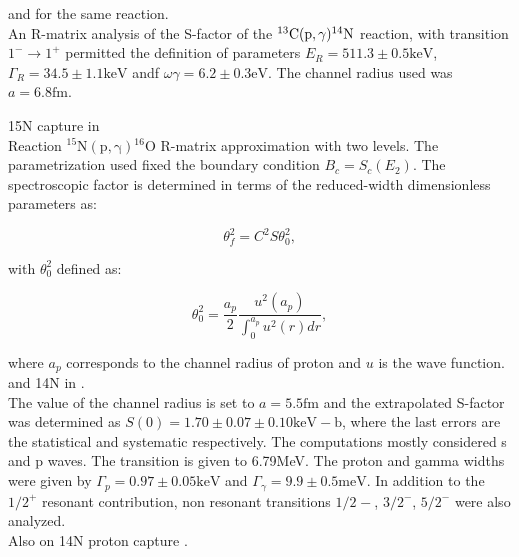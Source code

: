 \documentclass[openany]{book}
\begin{document}
  and \cite{genard_descouvemont_terwagne_2010} for the same reaction. \\

An R-matrix analysis of the S-factor of the $\mathrm{{}^{13}C(p, \gamma){}^{14}N}$ reaction, with transition $1^{-} \rightarrow 1^{+}$ permitted the definition of parameters $E_R = 511.3 \pm 0.5 \mathrm{keV}$, $\Gamma_R = 34.5 \pm 1.1 \mathrm{keV}$ andf $\omega \gamma = 6.2 \pm 0.3 \mathrm{eV}$. The channel radius used was $a = 6.8 \mathrm{fm}$.

15N capture in \cite{barker_2008}  \\

Reaction $\mathrm{{}^{15}N(p, \gamma) {}^{16}O}$ R-matrix approximation with two levels. The parametrization used fixed the boundary condition $B_c = S_c(E_2)$. The spectroscopic factor is determined in terms of the reduced-width dimensionless parameters as: 

\begin{equation}\label{eq:rmatrix_spectroscopic_reduced}
	\theta^2_f = C^2S \theta^2_0,
\end{equation}

with $\theta^2_0$ defined as:

\begin{equation}\label{eq:rmatrix_spectroscopic_reduced_theta0}
	\theta^2_0 = \frac{a_p}{2} \frac{u^2(a_p)}{\int_{0}^{a_p} {u^2(r) dr} },
\end{equation}

where $a_p$ corresponds to the channel radius of proton and $u$ is the wave function. \\

and 14N in \cite{angulo_champagne_trautvetter_2005}.  \\

The value of the channel radius is set to $a = 5.5\mathrm{fm}$ and the extrapolated S-factor was determined as $S(0) = 1.70 \pm 0.07 \pm 0.10 \mathrm{keV-b}$, where the last errors are the statistical and systematic respectively. The computations mostly considered s and p waves.  The transition is given to 	6.79MeV. The proton and gamma widths were given by $\Gamma_p =  0.97 \pm 0.05 \mathrm{keV}$ and $\Gamma_\gamma = 9.9 \pm 0.5 \mathrm{meV}$. In addition to the $1/2^{+}$ resonant contribution, non resonant transitions $1/2^{}-$, $3/2^{-}$, $5/2^{-}$ were also analyzed. \\


Also on 14N proton capture \cite{formicola_imbriani_costantini_angulo_bemmerer_bonetti_broggini_corvisiero_cruz_descouvemont_et_2004}. \\
\end{document}
